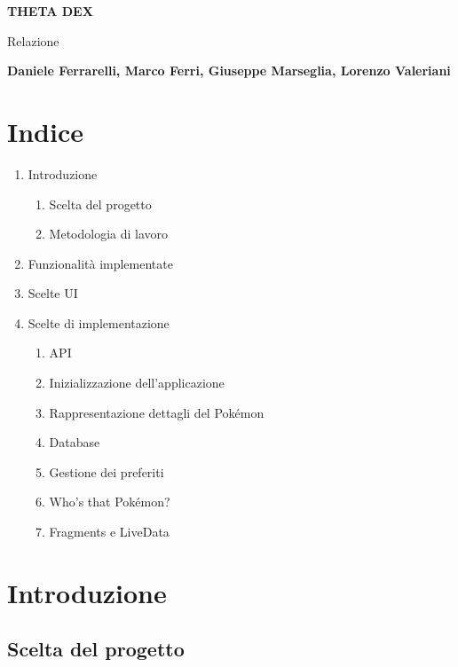 \documentclass[a4paper,11pt]{article}
\begin{document}
	\begin{titlepage}
   		\begin{center}
    	   \vspace*{1cm}
 
       		\textbf{THETA DEX}
 
			\vspace{0.5cm}
       		Relazione
 
	       \vspace{5cm}
 
	       \textbf{Daniele Ferrarelli, Marco Ferri, Giuseppe Marseglia, Lorenzo Valeriani}
 
	       \vfill
		\end{center}
	\end{titlepage}
	

	\section{Indice}
		\begin{enumerate}
			\item Introduzione
				\begin{enumerate}
					\item Scelta del progetto
					\item Metodologia di lavoro
				\end{enumerate}
			\item Funzionalità implementate
			\item Scelte UI
			\item Scelte di implementazione
				\begin{enumerate}
					\item API
					\item Inizializzazione dell'applicazione
					\item Rappresentazione dettagli del Pokémon
					\item Database
					\item Gestione dei preferiti
					\item Who's that Pokémon?
					\item Fragments e LiveData
				\end{enumerate}
		\end{enumerate}
	\newpage
	
	\section{Introduzione}
		\subsection{Scelta del progetto}
\end{document}
